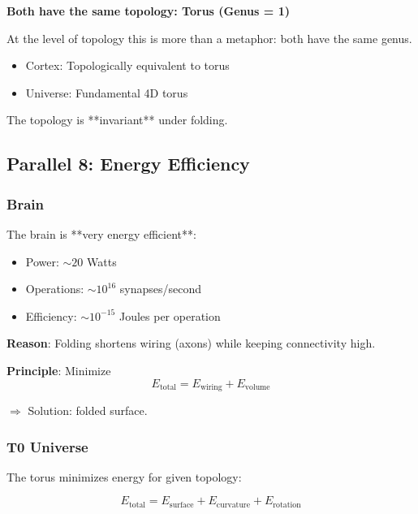 	\begin{keyresult}
		\textbf{Both have the same topology: Torus (Genus = 1)}

		At the level of topology this is more than a metaphor: both have the same genus.

		\begin{itemize}
			\item Cortex: Topologically equivalent to torus
			\item Universe: Fundamental 4D torus
		\end{itemize}

		The topology is **invariant** under folding.
	\end{keyresult}

	\subsection{Parallel 8: Energy Efficiency}

	\subsubsection{Brain}

	The brain is **very energy efficient**:

	\begin{itemize}
		\item Power: $\sim 20$ Watts
		\item Operations: $\sim 10^{16}$ synapses/second
		\item Efficiency: $\sim 10^{-15}$ Joules per operation
	\end{itemize}

	\textbf{Reason}: Folding shortens wiring (axons) while keeping connectivity high.

	\textbf{Principle}: Minimize
	\begin{equation}
		E_{\text{total}} = E_{\text{wiring}} + E_{\text{volume}}
	\end{equation}

	$\Rightarrow$ Solution: folded surface.

	\subsubsection{T0 Universe}

	The torus minimizes energy for given topology:

	\begin{equation}
		E_{\text{total}} = E_{\text{surface}} + E_{\text{curvature}} + E_{\text{rotation}}
	\end{equation}

